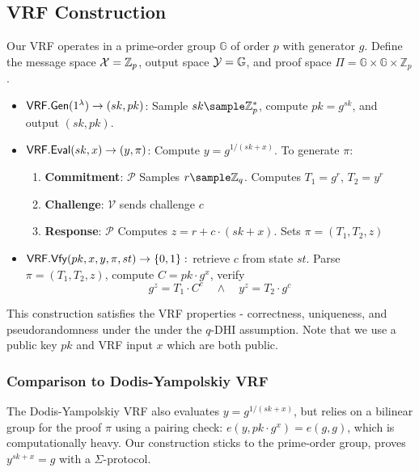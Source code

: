 \subsection{VRF Construction}
Our VRF operates in a prime-order group $\mathbb{G}$ of order $p$ with generator $g$. Define the message space $\mathcal{X} = \mathbb{Z}_p$, output space $\mathcal{Y} = \mathbb{G}$, and proof space $\Pi = \mathbb{G} \times \mathbb{G} \times \mathbb{Z}_p$. 
\begin{itemize}
    \item $\mathsf{VRF.Gen}(1^\lambda) \to (sk, pk)$:  
    Sample $sk \sample \mathbb{Z}_p^*$, compute $pk = g^{sk}$, and output $(sk, pk)$.
    \item $\mathsf{VRF.Eval}(sk, x) \to (y, \pi)$:  
    Compute $y = g^{1/(sk + x)}$.  
    To generate $\pi$:  
    \begin{enumerate}
        \item \textbf{Commitment}: $\mathcal{P}$ Samples $r \sample \Z_q$. Computes $T_1 = g^r$, $T_2 = y^r$
        \item \textbf{Challenge}: $\mathcal{V}$ sends challenge $c$
        \item \textbf{Response}: $\mathcal{P}$ Computes $z= r + c \cdot (sk + x)$. Sets $\pi = (T_1, T_2, z)$
    \end{enumerate}
    \item $\mathsf{VRF.Vfy}(pk, x, y, \pi, st) \to \{0,1\}:$ retrieve $c$ from state $st$. Parse $\pi = (T_1, T_2, z)$, compute $C = pk \cdot g^x$, verify
    \[
        g^z = T_1 \cdot C^c \quad \wedge \quad y^z = T_2 \cdot g^c
    \]
\end{itemize}
This construction satisfies the VRF properties - correctness, uniqueness, and pseudorandomness under the under the $q$-DHI assumption. Note that we use a public key $pk$ and VRF input $x$ which are both public. 

\subsubsection{Comparison to Dodis-Yampolskiy VRF}
The Dodis-Yampolskiy VRF also evaluates $y = g^{1/(sk + x)}$, but relies on a bilinear group for the proof $\pi$ using a pairing check: $e(y, pk \cdot g^x) = e(g, g)$, which is computationally heavy. Our construction sticks to the prime-order group, proves $y^{sk + x} = g$ with a $\Sigma$-protocol.










